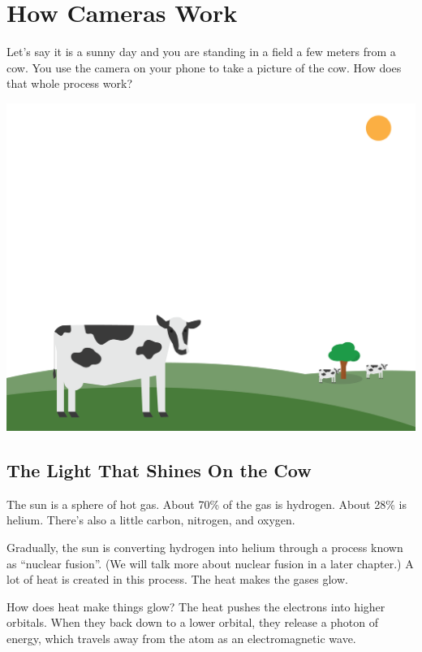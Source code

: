 \chapter{How Cameras Work}

Let's say it is a sunny day and you are standing in a field a few meters
from a cow. You use the camera on your phone to take a picture of the
cow. How does that whole process work?

\includegraphics[width=1\textwidth]{cow1.png}


\section{The Light That Shines On the Cow}

The sun is a sphere of hot gas. About 70\% of the gas is
hydrogen. About 28\% is helium. There's also a little carbon, nitrogen,
and oxygen.

Gradually, the sun is converting hydrogen into helium through a
process known as ``nuclear fusion''. (We will talk more about nuclear
fusion in a later chapter.) A lot of heat is created in this
process. The heat makes the gases glow.

How does heat make things glow? The heat pushes the electrons into
higher orbitals.  When they back down to a lower orbital, they
release a photon of energy, which travels away from the atom as an
electromagnetic wave.

